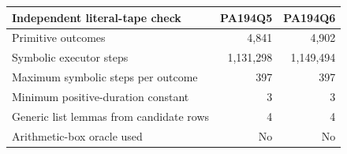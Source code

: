 \begin{center}\small
\begin{tabular}{@{}lrr@{}}\toprule
Independent literal-tape check & PA194Q5 & PA194Q6\\\midrule
Primitive outcomes & 4,841 & 4,902\\
Symbolic executor steps & 1,131,298 & 1,149,494\\
Maximum symbolic steps per outcome & 397 & 397\\
Minimum positive-duration constant & 3 & 3\\
Generic list lemmas from candidate rows & 4 & 4\\
Arithmetic-box oracle used & No & No\\
\bottomrule\end{tabular}
\end{center}
